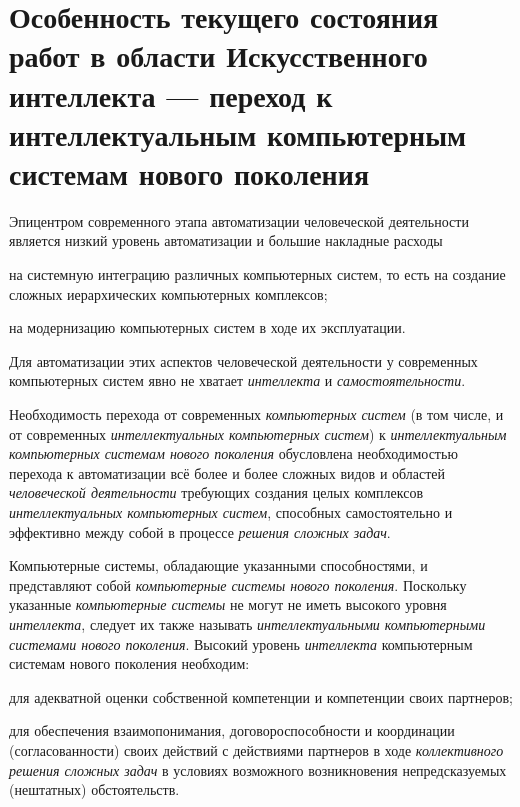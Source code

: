 \section*{Особенность текущего состояния работ в области Искусственного интеллекта --- переход к интеллектуальным компьютерным системам нового поколения}
\label{concl_feature_current_state_work_field_AI}

Эпицентром современного этапа автоматизации человеческой деятельности является низкий уровень автоматизации и большие накладные расходы
\begin{textitemize}
	\item на системную интеграцию различных компьютерных систем, то есть на создание сложных иерархических компьютерных комплексов;
	\item на модернизацию компьютерных систем в ходе их эксплуатации.
\end{textitemize}

Для автоматизации этих аспектов человеческой деятельности у современных компьютерных систем явно не хватает \textit{интеллекта} и \textit{самостоятельности}.

Необходимость перехода от современных \textit{компьютерных систем} (в том числе, и от современных \textit{интеллектуальных компьютерных систем}) к \textit{интеллектуальным компьютерных системам нового поколения} обусловлена необходимостью перехода к автоматизации всё более и более сложных видов и областей \textit{человеческой деятельности} требующих создания целых комплексов \textit{интеллектуальных компьютерных систем}, способных самостоятельно  и эффективно  между собой в процессе \textit{ решения сложных задач}.

Компьютерные системы, обладающие указанными способностями, и представляют собой \textit{компьютерные системы нового поколения}. Поскольку указанные \textit{компьютерные системы} не могут не иметь высокого уровня \textit{интеллекта}, следует их также называть \textit{интеллектуальными компьютерными системами нового поколения}. Высокий уровень \textit{интеллекта} компьютерным системам нового поколения необходим:
\begin{textitemize}
	\item для адекватной оценки собственной компетенции и компетенции своих партнеров;
	\item для обеспечения взаимопонимания, договороспособности и координации (согласованности) своих действий с действиями партнеров в ходе \textit{коллективного решения сложных задач} в условиях возможного возникновения непредсказуемых (нештатных) обстоятельств.
\end{textitemize}


